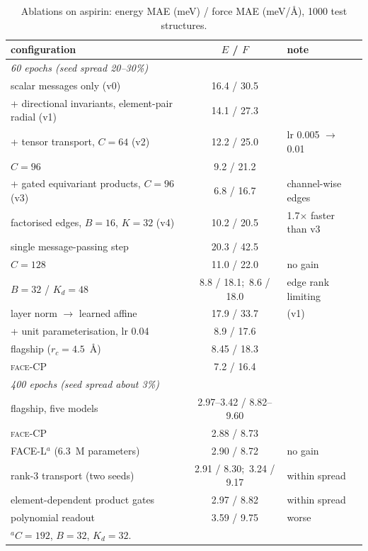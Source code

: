 \documentclass[journal=jctcce,manuscript=article,layout=traditional]{achemso}
\newcommand{\FACE}{\textup{\textsc{face}}}
\begin{document}
\begin{table}
\caption{Ablations on aspirin: energy MAE (meV) / force MAE (meV/\AA), 1000 test structures.}
\label{tab:ablation}
\small\setlength{\tabcolsep}{4pt}
\begin{tabular}{lcl}
\toprule
configuration & $E$ / $F$ & note \\
\midrule
\multicolumn{3}{l}{\emph{60 epochs (seed spread 20--30\%)}} \\
scalar messages only (v0) & 16.4 / 30.5 & \\
+ directional invariants, element-pair radial (v1) & 14.1 / 27.3 & \\
+ tensor transport, $C=64$ (v2) & 12.2 / 25.0 & lr 0.005 $\to$ 0.01 \\
\quad $C=96$ & 9.2 / 21.2 & \\
+ gated equivariant products, $C=96$ (v3) & 6.8 / 16.7 & channel-wise edges \\
factorised edges, $B=16$, $K=32$ (v4) & 10.2 / 20.5 & 1.7$\times$ faster than v3 \\
\quad single message-passing step & 20.3 / 42.5 & \\
\quad $C=128$ & 11.0 / 22.0 & no gain \\
\quad $B=32$ / $K_d=48$ & 8.8 / 18.1;\ 8.6 / 18.0 & edge rank limiting \\
\quad layer norm $\to$ learned affine & 17.9 / 33.7 & (v1) \\
+ unit parameterisation, lr 0.04 & 8.9 / 17.6 & \\
flagship ($r_c=4.5$~\AA) & 8.45 / 18.3 & \\
\FACE-CP & 7.2 / 16.4 & \\
\midrule
\multicolumn{3}{l}{\emph{400 epochs (seed spread about 3\%)}} \\
flagship, five models & 2.97--3.42 / 8.82--9.60 & \\
\FACE-CP & 2.88 / 8.73 & \\
FACE-L$^a$ (6.3~M parameters) & 2.90 / 8.72 & no gain \\
rank-3 transport (two seeds) & 2.91 / 8.30;\ 3.24 / 9.17 & within spread \\
element-dependent product gates & 2.97 / 8.82 & within spread \\
polynomial readout & 3.59 / 9.75 & worse \\
\bottomrule
\multicolumn{3}{l}{\footnotesize $^a$$C=192$, $B=32$, $K_d=32$.} \\
\end{tabular}
\end{table}
\end{document}
